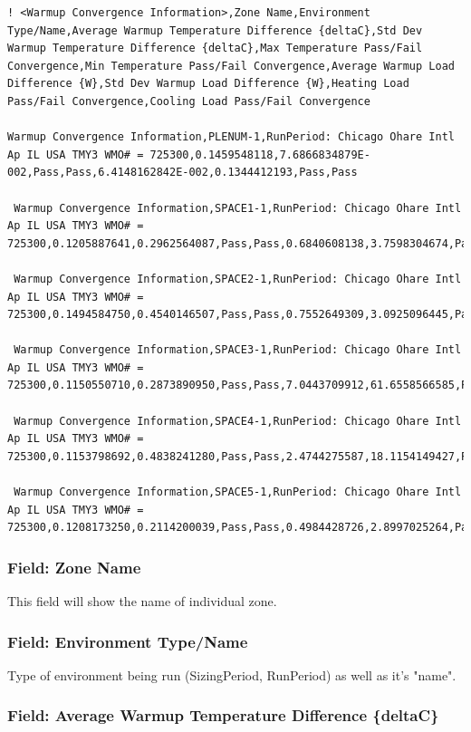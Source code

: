 \begin{lstlisting}
! <Warmup Convergence Information>,Zone Name,Environment Type/Name,Average Warmup Temperature Difference {deltaC},Std Dev Warmup Temperature Difference {deltaC},Max Temperature Pass/Fail Convergence,Min Temperature Pass/Fail Convergence,Average Warmup Load Difference {W},Std Dev Warmup Load Difference {W},Heating Load Pass/Fail Convergence,Cooling Load Pass/Fail Convergence

Warmup Convergence Information,PLENUM-1,RunPeriod: Chicago Ohare Intl Ap IL USA TMY3 WMO# = 725300,0.1459548118,7.6866834879E-002,Pass,Pass,6.4148162842E-002,0.1344412193,Pass,Pass

 Warmup Convergence Information,SPACE1-1,RunPeriod: Chicago Ohare Intl Ap IL USA TMY3 WMO# = 725300,0.1205887641,0.2962564087,Pass,Pass,0.6840608138,3.7598304674,Pass,Pass

 Warmup Convergence Information,SPACE2-1,RunPeriod: Chicago Ohare Intl Ap IL USA TMY3 WMO# = 725300,0.1494584750,0.4540146507,Pass,Pass,0.7552649309,3.0925096445,Pass,Pass

 Warmup Convergence Information,SPACE3-1,RunPeriod: Chicago Ohare Intl Ap IL USA TMY3 WMO# = 725300,0.1150550710,0.2873890950,Pass,Pass,7.0443709912,61.6558566585,Pass,Pass

 Warmup Convergence Information,SPACE4-1,RunPeriod: Chicago Ohare Intl Ap IL USA TMY3 WMO# = 725300,0.1153798692,0.4838241280,Pass,Pass,2.4744275587,18.1154149427,Pass,Pass

 Warmup Convergence Information,SPACE5-1,RunPeriod: Chicago Ohare Intl Ap IL USA TMY3 WMO# = 725300,0.1208173250,0.2114200039,Pass,Pass,0.4984428726,2.8997025264,Pass,Pass
\end{lstlisting}

\subsubsection{Field: Zone Name}

This field will show the name of individual zone.

\subsubsection{Field: Environment Type/Name}

Type of environment being run (SizingPeriod, RunPeriod) as well as it’s "name".

\subsubsection{Field: Average Warmup Temperature Difference \{deltaC\}}

